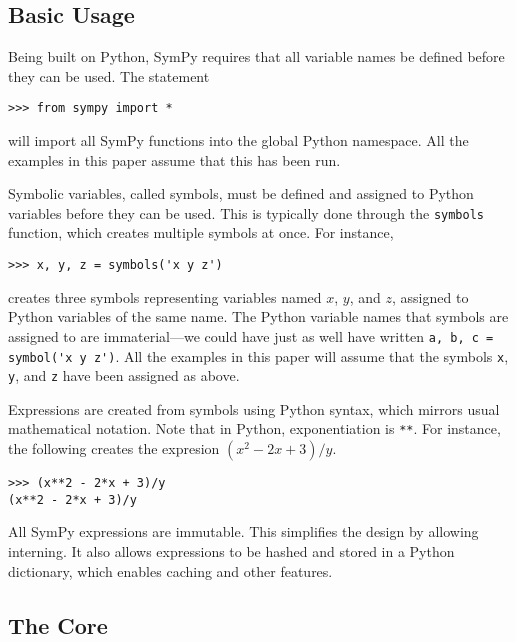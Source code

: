 \subsection{Basic Usage}


Being built on Python, SymPy requires that all variable names be defined
before they can be used. The statement
\begin{verbatim}
>>> from sympy import *
\end{verbatim}
will import all SymPy functions into the global Python namespace. All the
examples in this paper assume that this has been run.

Symbolic variables, called symbols, must be defined and assigned to
Python variables before they can be used. This is typically done through the
\texttt{symbols} function, which creates multiple symbols at once. For
instance,
\begin{verbatim}
>>> x, y, z = symbols('x y z')
\end{verbatim}
creates three symbols representing variables named $x$, $y$, and $z$, assigned
to Python variables of the same name. The Python variable names that symbols
are assigned to are immaterial---we could have just as well have written
\verb|a, b, c = symbol('x y z')|. All the examples in this paper will assume
that the symbols \verb|x|, \verb|y|, and \verb|z| have been assigned as above.

Expressions are created from symbols using Python syntax, which mirrors usual
mathematical notation. Note that in Python, exponentiation is \verb|**|. For
instance, the following creates the expresion $(x^2 - 2x + 3)/y$.
\begin{verbatim}
>>> (x**2 - 2*x + 3)/y
(x**2 - 2*x + 3)/y
\end{verbatim}

All SymPy expressions are immutable. This simplifies the design by allowing
interning. It also allows expressions to be hashed and stored in a Python
dictionary, which enables caching and other features.


\subsection{The Core}

